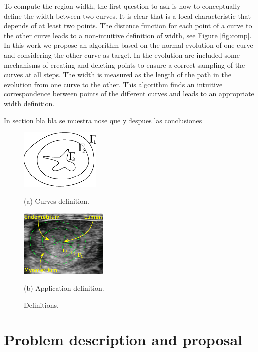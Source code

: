 \documentclass{article}
\begin{document}
To compute the region width, the first question to ask is how to
conceptually define the width between two curves. It is clear that is
a local characteristic that depends of at least two points. The
distance function for each point of a curve to the other curve leads
to a non-intuitive definition of width, see Figure \ref{fig:comp}. In
this work we propose an algorithm based on the normal evolution of one
curve and considering the other curve as target. In the evolution are
included some mechanisms of creating and deleting points to ensure a
correct sampling of the curves at all steps. The width is measured as
the length of the path in the evolution from one curve to the
other. This algorithm finds an intuitive correspondence between points
of the different curves and leads to an appropriate width definition.

In section bla bla se muestra nose que y despues las conclusiones

\begin{figure}[t]
  \begin{minipage}[b]{.45\linewidth}
    \centering
    \centerline{\includegraphics[width=3.8cm]{pics/defs2}}
    \centerline{(a) Curves definition.}\medskip
  \end{minipage}\hfill
  \begin{minipage}[b]{.52\linewidth}
    \centering
    \centerline{\includegraphics[width=4.2cm]{pics/defsEndo}}
    \centerline{(b) Application definition.}\medskip
  \end{minipage}
  \caption{Definitions.}
  \label{fig:defs}
\end{figure}

\section{Problem description and proposal}
\label{sec:proposal}
\end{document}
